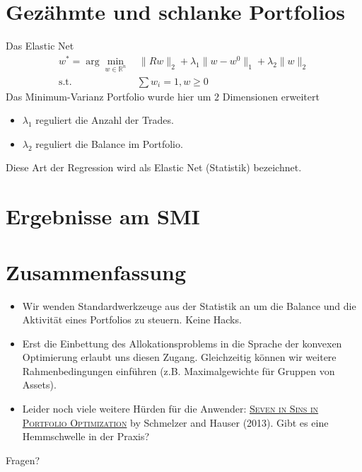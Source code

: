 \documentclass[10pt]{beamer}
\newcommand{\R}{\mathbb R}
\providecommand{\norm}[1]{\lVert#1\rVert}
\begin{document}
\section{Gezähmte und schlanke Portfolios}
\begin{frame}{Das Elastic Net}
\begin{align}
w^*=\arg\min_{w\in\R^n}&\, \norm{Rw}_2 + \lambda_1 \norm{w-w^0}_1 + \lambda_2 \norm{w}_2 \\
\text{s.t. }&\sum w_i = 1, w\geq 0\nonumber
\end{align}
Das Minimum-Varianz Portfolio wurde hier um $2$ Dimensionen erweitert
\begin{itemize}
\item $\lambda_1$ reguliert die Anzahl der Trades.
\item $\lambda_2$ reguliert die Balance im Portfolio.
\end{itemize}
Diese Art der Regression wird als Elastic Net (Statistik) bezeichnet.
\end{frame}

\section{Ergebnisse am SMI}

\begin{frame}
\begin{itemize}

\end{itemize}
\end{frame}

\section{Zusammenfassung}

\begin{frame}
\begin{itemize}
\item Wir wenden Standardwerkzeuge aus der Statistik an um die Balance und die Aktivität eines Portfolios zu steuern. Keine Hacks.
\item Erst die Einbettung des Allokationsproblems in die Sprache der konvexen Optimierung erlaubt uns diesen Zugang. Gleichzeitig können wir weitere Rahmenbedingungen einführen (z.B. Maximalgewichte für Gruppen von Assets).
\item Leider noch viele weitere Hürden für die Anwender: \href{https://arxiv.org/abs/1310.3396}{\textsc{Seven in Sins in Portfolio Optimization}} by Schmelzer and Hauser (2013). Gibt es eine Hemmschwelle in der Praxis?
\end{itemize}
\end{frame}

{
\begin{frame}[standout]
  Fragen?
\end{frame}
}
\end{document}
